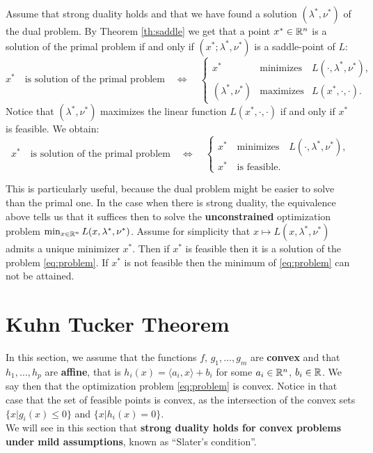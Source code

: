 \documentclass[11pt,nocut]{article}
\begin{document}
Assume that strong duality holds and that we have found a solution $(\lambda^*,\nu^*)$ of the dual problem. 
By Theorem \ref{th:saddle} we get that a point $x^* \in \mathbb{R}^n$ is a solution of the primal problem if and only if $(x^*;\lambda^*,\nu^*)$ is a saddle-point of $L$:
$$
x^* \quad \text{is solution of the primal problem} \quad
\Longleftrightarrow
\quad
\left\{
	\!\!
\begin{array}{lll}
	x^* & \text{minimizes} & L(\cdot, \lambda^*,\nu^*), \\
	(\lambda^*,\nu^*) & \text{maximizes} & L(x^*, \cdot, \cdot).
\end{array}
\right.
$$
Notice that $(\lambda^*,\nu^*)$ maximizes the linear function $L(x^*, \cdot,\cdot)$ if and only if $x^*$ is feasible. We obtain:
$$
x^* \quad \text{is solution of the primal problem} \quad
\Longleftrightarrow
\quad
\begin{cases}
	x^* \quad \text{minimizes} \quad L(\cdot, \lambda^*,\nu^*), \\
	x^* \quad \text{is feasible.}
\end{cases}
$$

This is particularly useful, because the dual problem might be easier to solve than the primal one. In the case when there is strong duality, the equivalence above tells us that it suffices then to solve the \textbf{unconstrained} optimization problem $\min_{x \in \mathbb{R}^n} L(x,\lambda^*,\nu^*)$.
Assume for simplicity that $x \mapsto L(x,\lambda^*,\nu^*)$ admits a unique minimizer $x^*$. Then if $x^*$ is feasible then it is a solution of the problem \eqref{eq:problem}. 
If $x^*$ is not feasible then the minimum of \eqref{eq:problem} can not be attained.

\section{Kuhn Tucker Theorem}

In this section, we assume that the functions $f$, $g_1, \dots, g_m$ are \textbf{convex} and that $h_1, \dots, h_p$ are \textbf{affine}, that is $h_i(x) = \langle a_i,x \rangle + b_i$ for some $a_i \in \mathbb{R}^n$, $b_i \in \mathbb{R}$. We say then that the optimization problem \eqref{eq:problem} is convex.
Notice in that case that the set of feasible points is convex, as the intersection of the convex sets $\{x | g_i(x) \leq 0 \}$ and $\{x|h_i(x) =0\}$.
\\

We will see in this section that \textbf{strong duality holds for convex problems under mild assumptions}, known as ``Slater's condition''.
\end{document}
